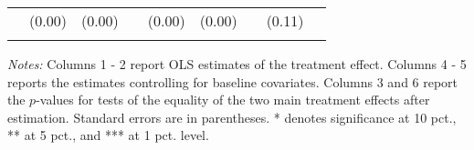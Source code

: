 \begin{table}[htbp]
{\begin{threeparttable}
\begin{tabular}{l*{8}{c}}
          &   (0.00)&   (0.00)&         &   (0.00)&   (0.00)&         &   (0.11)&         \\
          &         &         &         &         &         &         &         &         \\
\bottomrule \end{tabular} \begin{tablenotes}[flushleft] \footnotesize \item \emph{Notes:} Columns 1 - 2 report OLS estimates of the treatment effect. Columns 4 - 5 reports the estimates controlling for baseline covariates. Columns 3 and 6 report the \(p\)-values for tests of the equality of the two main treatment effects after estimation. Standard errors are in parentheses. * denotes significance at 10 pct., ** at 5 pct., and *** at 1 pct. level. \end{tablenotes} \end{threeparttable} } \end{table}

